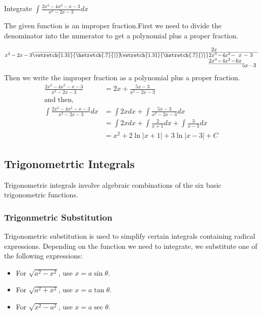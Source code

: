 \begin{exercise}
	Integrate $\int \frac{2 x^{3}-4 x^{2}-x-3}{x^{2}-2 x-3} d x$
\end{exercise}
\newcommand{\longdiv}{\smash{\mkern-0.43mu\vstretch{1.31}{\hstretch{.7}{)}}\mkern-5.2mu\vstretch{1.31}{\hstretch{.7}{)}}}}
\begin{answer}The given function is an improper fraction.First we need to divide the denominator into the numerator to get a polynomial plus a proper fraction.
	
	\[
	\arraycolsep=0.5pt
	\renewcommand\arraystretch{0.6}
	\begin{array}{*1r @{\hskip\arraycolsep}c@{\hskip\arraycolsep} *{11}r}
	&          & 2x &  &  & &  &  &  &  &  &  &   \\
	\cline{2-13}
	x ^ { 2 } - 2 x - 3  &\longdiv &  2 x ^ { 3 } & -  & 4 x ^ { 2 }   & -  &  x     & -  & 3     &   &      &   &        \\
	&          & 2 x ^ { 3 } & - & 4 x ^ { 2 } & - &  6x &   &      &   &      &   &        \\
	\cline{3-7}
	&          &   &   &  &  &   & 5x  & -     & 3  &      &   &        
	\end{array}
	\]
	Then we write the improper fraction as a polynomial plus a proper fraction.
	\begin{align*}
	\frac{2 x^{3}-4 x^{2}-x-3}{x^{2}-2 x-3}&=2 x+\frac{5 x-3}{x^{2}-2 x-3}\\
	\text{and then,}\\
	\int \frac{2 x^{3}-4 x^{2}-x-3}{x^{2}-2 x-3} d x &=\int 2 x d x+\int \frac{5 x-3}{x^{2}-2 x-3} d x \\
	&=\int 2 x d x+\int \frac{2}{x+1} d x+\int \frac{3}{x-3} d x \\
	&=x^{2}+2 \ln |x+1|+3 \ln |x-3|+C
	\end{align*}
	
	
\end{answer}
\subsection{Trigonometrtic Integrals}
Trigonometric integrals involve algebraic combinations of the six basic trigonometric
functions.
\subsubsection{Trigonmetric Substitution}
Trigonometric substitution is used to simplify certain integrals containing radical expressions. Depending on the function we need to integrate, we substitute one of the following expressions:
\begin{itemize}
	\item For $\sqrt{a^{2}-x^{2}}$, use $x=a \sin \theta$.
	\item For $\sqrt{a^{2}+x^{2}}$, use $x=a \tan \theta$.
	\item For $\sqrt{x^{2}-a^{2}}$, use $x=a \sec \theta$.
\end{itemize}
